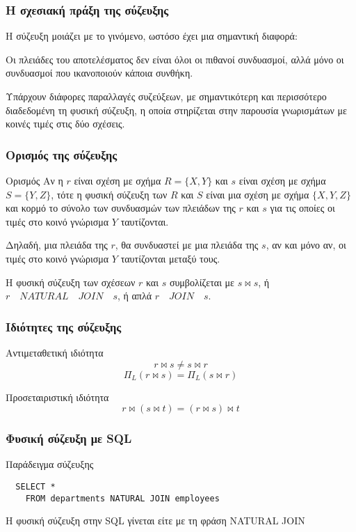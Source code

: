 
\begin{frame}[shrink]
\frametitle{Η σχεσιακή πράξη της σύζευξης}
Η σύζευξη μοιάζει με το γινόμενο, ωστόσο έχει μια σημαντική διαφορά:

Οι πλειάδες του αποτελέσματος
δεν είναι όλοι οι πιθανοί συνδυασμοί, αλλά μόνο οι συνδυασμοί που ικανοποιούν κάποια συνθήκη.

Υπάρχουν διάφορες παραλλαγές συζεύξεων, με σημαντικότερη και περισσότερο διαδεδομένη τη
 φυσική σύζευξη, η οποία στηρίζεται στην παρουσία γνωρισμάτων
με κοινές τιμές στις δύο σχέσεις.
\end{frame}

\begin{frame}[shrink]
\frametitle{Ορισμός της σύζευξης}
\begin{block}{Ορισμός}
Αν η $r$ είναι σχέση με σχήμα $R=\{X,Y\}$ και $s$ είναι σχέση με σχήμα $S=\{Y,Z\}$, τότε η φυσική
σύζευξη των $R$ και $S$ είναι μια σχέση με σχήμα $\{X,Y,Z\}$ και κορμό το σύνολο των συνδυασμών των
πλειάδων της $r$ και $s$ για τις οποίες οι τιμές στο κοινό γνώρισμα $Y$ ταυτίζονται.

Δηλαδή, μια πλειάδα της $r$, θα συνδυαστεί με μια πλειάδα της $s$,
αν και μόνο αν, οι τιμές στο κοινό γνώρισμα $Y$ ταυτίζονται μεταξύ τους.

Η φυσική σύζευξη των σχέσεων $r$ και $s$ συμβολίζεται με $s \bowtie s$,
ή $r \quad NATURAL \quad JOIN \quad s$, ή απλά $r \quad JOIN \quad s$.
\end{block}
\end{frame}



\begin{frame}
\frametitle{Ιδιότητες της σύζευξης}
\begin{block}{Αντιμεταθετική ιδιότητα}
\[
  r \bowtie s \neq s \bowtie r
\]
\[ \Pi_L (r \bowtie s) = \Pi_L (s \bowtie r) \]
\end{block}
\begin{block}{Προσεταιριστική ιδιότητα}
\[
r \bowtie (s \bowtie t) = (r \bowtie s) \bowtie  t
\]
\end{block}
\end{frame}


\begin{frame}[fragile]
\frametitle{Φυσική σύζευξη με {\sq SQL}}
\begin{block}{Παράδειγμα σύζευξης} \en
\begin{lstlisting}
  SELECT *
    FROM departments NATURAL JOIN employees
\end{lstlisting}
\el
Η φυσική σύζευξη στην {\sq SQL} γίνεται είτε με τη φράση {\sq NATURAL JOIN}
\end{block}
\end{frame}


